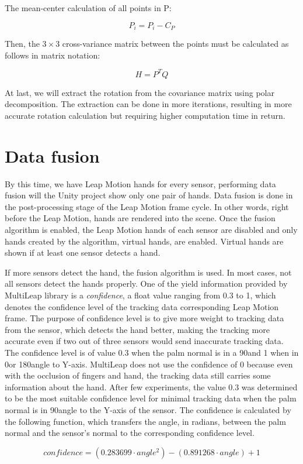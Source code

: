 The mean-center calculation of all points in P:

\begin{equation}
    {P_i = P_i - C_P}
\end{equation}

Then, the $3\times3$ cross-variance matrix between the points must be calculated as follows in matrix notation:

\begin{equation}
    {H = P^T Q}
\end{equation}

At last, we will extract the rotation from the covariance matrix using polar decomposition. The extraction can be done in more iterations, resulting in more accurate rotation calculation but requiring higher computation time in return.

\section{Data fusion}

By this time, we have Leap Motion hands for every sensor, performing data fusion will the Unity project show only one pair of hands. Data fusion is done in the post-processing stage of the Leap Motion frame cycle. In other words, right before the Leap Motion, hands are rendered into the scene. Once the fusion algorithm is enabled, the Leap Motion hands of each sensor are disabled and only hands created by the algorithm, virtual hands, are enabled. Virtual hands are shown if at least one sensor detects a hand.

If more sensors detect the hand, the fusion algorithm is used. In most cases, not all sensors detect the hands properly. One of the yield information provided by MultiLeap library is a \textit{confidence}, a float value ranging from 0.3 to 1, which denotes the confidence level of the tracking data corresponding Leap Motion frame. The purpose of confidence level is to give more weight to tracking data from the sensor, which detects the hand better, making the tracking more accurate even if two out of three sensors would send inaccurate tracking data. The confidence level is of value 0.3 when the palm normal is in a 90\textdegree and 1 when in 0\textdegree or 180\textdegree angle to Y-axis. MultiLeap does not use the confidence of 0 because even with the occlusion of fingers and hand, the tracking data still carries some information about the hand. After few experiments, the value 0.3 was determined to be the most suitable confidence level for minimal tracking data when the palm normal is in 90\textdegree angle to the Y-axis of the sensor. The confidence is calculated by the following function, which transfers the angle, in radians, between the palm normal and the sensor's normal to the corresponding confidence level.

\begin{equation}
    {confidence = (0.283699 \cdot angle^2)-(0.891268 \cdot angle)+1}
\end{equation}


